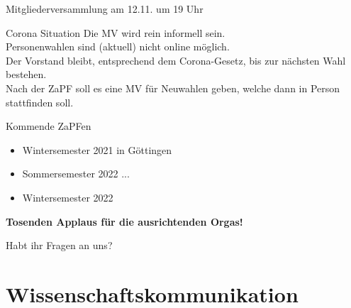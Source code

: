 \documentclass[compress, aspectratio=169]{beamer}
\begin{document}
\begin{frame}{Mitgliederversammlung am 12.11. um 19 Uhr}
  \begin{block}{Corona Situation}
    Die MV wird rein informell sein.\\
    Personenwahlen sind (aktuell) nicht online möglich.\\
    Der Vorstand bleibt, entsprechend dem Corona-Gesetz, bis zur nächsten Wahl bestehen.\\[1.5em]
    Nach der ZaPF soll es eine MV für Neuwahlen geben, welche dann in Person stattfinden soll.
  \end{block}
\end{frame}

\begin{frame}{Kommende ZaPFen}
  \begin{itemize}
    \item Wintersemester 2021 in Göttingen
    \item Sommersemester 2022 ...
    \item Wintersemester 2022 \textit{\color{blue}{bei euch?}}    
\end{itemize}
    \vspace{1cm}
    \begin{center}
      \huge \textbf{Tosenden Applaus für die ausrichtenden Orgas!}
    \end{center}
\end{frame}

\begin{frame}[plain]
  \begin{center}
    \Huge Habt ihr Fragen an uns?
    \end{center}
\end{frame}


\section{Wissenschaftskommunikation}
\end{document}
